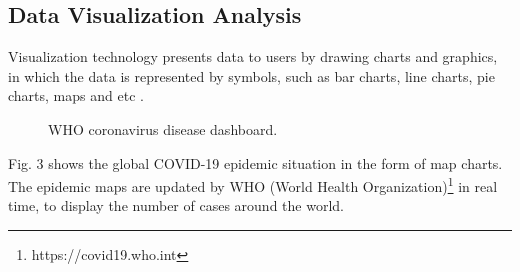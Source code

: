 \documentclass[conference]{IEEEtran}
\begin{document}
\subsection{Data Visualization Analysis}
Visualization technology presents data to users by drawing charts and graphics, in which the data is represented by symbols, such as bar charts, line charts, pie charts, maps and etc \cite{jensen1992harvard}.
\begin{figure}[h]
    \centering
    \caption{WHO coronavirus disease dashboard.}
\end{figure}

Fig. 3 shows the global COVID-19 epidemic situation in the form of map charts. The epidemic maps are updated by WHO (World Health Organization)\footnote{https://covid19.who.int} in real time, to display the number of cases around the world.
\end{document}
